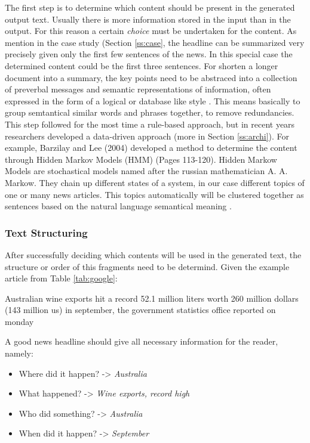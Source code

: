 The first step is to determine which content should be present in the generated output text. Usually there is more information stored in the input than in the output. For this reason a certain \textit{choice} must be undertaken for the content. As mention in the case study (Section \ref{ss:case}, the headline can be summarized very precisely given only the first few sentences of the news. In this special case the determined content could be the first three sentences. For shorten a longer document into a summary, the key points need to be abstraced into a collection of preverbal messages and semantic representations of information, often expressed in the form of a logical or database like style \cite{gatt}. This means basically to group semtantical similar words and phrases together, to remove redundancies. This step followed for the most time a rule-based approach, but in recent years researchers developed a data-driven approach (more in Section \ref{ss:archi}). For example, Barzilay and Lee (2004) developed a method to determine the content through Hidden Markov Models (HMM) \cite{lee} (Pages 113-120). Hidden Markow Models are stochastical models named after the russian mathematician A. A. Markow. They chain up different states of a system, in our case different topics of one or many news articles. This topics automatically will be clustered together as sentences based on the natural language semantical meaning \cite{gatt}. 

\subsubsection{Text Structuring}

After successfully deciding which contents will be used in the generated text, the structure or order of this fragments need to be determind. Given the example article from Table \ref{tab:google}:

\begin{tcolorbox}
\begin{center}
		Australian wine exports hit a record 52.1 million liters worth 260 million dollars (143 million us) in september, the government statistics office reported on monday 
\end{center}
\end{tcolorbox}

A good news headline should give all necessary information for the reader, namely:

\begin{itemize}
	\item Where did it happen? -> \textit{Australia}
	\item What happened? -> \textit{Wine exports, record high}
	\item Who did something? -> \textit{Australia}
	\item When did it happen? -> \textit{September}
\end{itemize}


